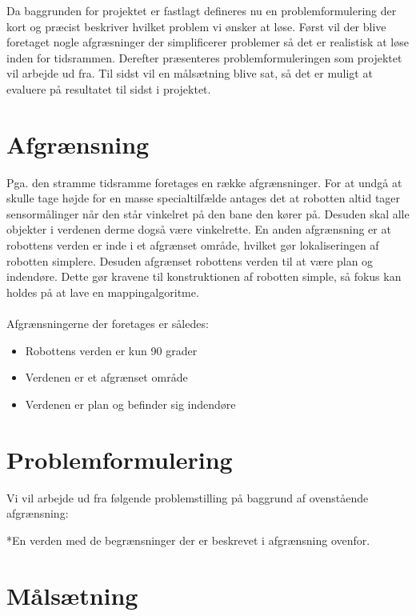Da baggrunden for projektet er fastlagt defineres nu en problemformulering der kort og præcist beskriver hvilket problem vi ønsker at løse.
Først vil der blive foretaget nogle afgræsninger der simplificerer problemer så det er realistisk at løse inden for tidsrammen.
Derefter præsenteres problemformuleringen som projektet vil arbejde ud fra.
Til sidst vil en målsætning blive sat, så det er muligt at evaluere på resultatet til sidst i projektet.

\section*{Afgrænsning}
Pga. den stramme tidsramme foretages en række afgrænsninger.
For at undgå at skulle tage højde for en masse specialtilfælde antages det at robotten altid tager sensormålinger når den står vinkelret på den bane den kører på.
Desuden skal alle objekter i verdenen derme dogså være vinkelrette. 
En anden afgrænsning er at robottens verden er inde i et afgrænset område, hvilket gør lokaliseringen af robotten simplere.
Desuden afgrænset robottens verden til at være plan og indendøre. 
Dette gør kravene til konstruktionen af robotten simple, så fokus kan holdes på at lave en mappingalgoritme.

\paragraph{}
 Afgrænsningerne der foretages er således:
\begin{itemize}
\item Robottens verden er kun 90 grader
\item Verdenen er et afgrænset område
\item Verdenen er plan og befinder sig indendøre
\end{itemize}

\section*{Problemformulering}\label{problemformulering}
Vi vil arbejde ud fra følgende problemstilling på baggrund af ovenstående afgrænsning:

\begin{samepage}


\end{samepage}
*En verden med de begrænsninger der er beskrevet i afgrænsning ovenfor.

\section*{Målsætning}
